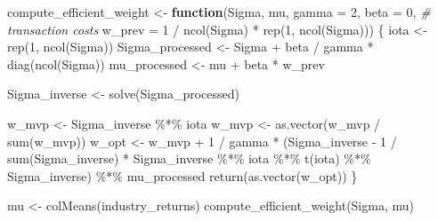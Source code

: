 \documentclass[
]{krantz}
\newenvironment{Shaded}{\begin{snugshade}}{\end{snugshade}}
\newcommand{\AttributeTok}[1]{\textcolor[rgb]{0.61,0.61,0.61}{#1}}
\newcommand{\CommentTok}[1]{\textcolor[rgb]{0.37,0.37,0.37}{\textit{#1}}}
\newcommand{\ControlFlowTok}[1]{\textcolor[rgb]{0.27,0.27,0.27}{\textbf{#1}}}
\newcommand{\DecValTok}[1]{\textcolor[rgb]{0.06,0.06,0.06}{#1}}
\newcommand{\FunctionTok}[1]{\textcolor[rgb]{0,0,0}{#1}}
\newcommand{\NormalTok}[1]{#1}
\newcommand{\OtherTok}[1]{\textcolor[rgb]{0.37,0.37,0.37}{#1}}
\newcommand{\SpecialCharTok}[1]{\textcolor[rgb]{0,0,0}{#1}}
\begin{document}
\begin{Shaded}
\begin{Highlighting}[]
\NormalTok{compute\_efficient\_weight }\OtherTok{\textless{}{-}} \ControlFlowTok{function}\NormalTok{(Sigma,}
\NormalTok{                                     mu,}
                                     \AttributeTok{gamma =} \DecValTok{2}\NormalTok{,}
                                     \AttributeTok{beta =} \DecValTok{0}\NormalTok{, }\CommentTok{\# transaction costs}
                                     \AttributeTok{w\_prev =} \DecValTok{1} \SpecialCharTok{/} \FunctionTok{ncol}\NormalTok{(Sigma) }\SpecialCharTok{*} \FunctionTok{rep}\NormalTok{(}\DecValTok{1}\NormalTok{, }\FunctionTok{ncol}\NormalTok{(Sigma))) \{}
\NormalTok{  iota }\OtherTok{\textless{}{-}} \FunctionTok{rep}\NormalTok{(}\DecValTok{1}\NormalTok{, }\FunctionTok{ncol}\NormalTok{(Sigma))}
\NormalTok{  Sigma\_processed }\OtherTok{\textless{}{-}}\NormalTok{ Sigma }\SpecialCharTok{+}\NormalTok{ beta }\SpecialCharTok{/}\NormalTok{ gamma }\SpecialCharTok{*} \FunctionTok{diag}\NormalTok{(}\FunctionTok{ncol}\NormalTok{(Sigma))}
\NormalTok{  mu\_processed }\OtherTok{\textless{}{-}}\NormalTok{ mu }\SpecialCharTok{+}\NormalTok{ beta }\SpecialCharTok{*}\NormalTok{ w\_prev}

\NormalTok{  Sigma\_inverse }\OtherTok{\textless{}{-}} \FunctionTok{solve}\NormalTok{(Sigma\_processed)}

\NormalTok{  w\_mvp }\OtherTok{\textless{}{-}}\NormalTok{ Sigma\_inverse }\SpecialCharTok{\%*\%}\NormalTok{ iota}
\NormalTok{  w\_mvp }\OtherTok{\textless{}{-}} \FunctionTok{as.vector}\NormalTok{(w\_mvp }\SpecialCharTok{/} \FunctionTok{sum}\NormalTok{(w\_mvp))}
\NormalTok{  w\_opt }\OtherTok{\textless{}{-}}\NormalTok{ w\_mvp }\SpecialCharTok{+} \DecValTok{1} \SpecialCharTok{/}\NormalTok{ gamma }\SpecialCharTok{*}
\NormalTok{    (Sigma\_inverse }\SpecialCharTok{{-}} \DecValTok{1} \SpecialCharTok{/} \FunctionTok{sum}\NormalTok{(Sigma\_inverse) }\SpecialCharTok{*}\NormalTok{ Sigma\_inverse }\SpecialCharTok{\%*\%}\NormalTok{ iota }\SpecialCharTok{\%*\%} \FunctionTok{t}\NormalTok{(iota) }\SpecialCharTok{\%*\%}\NormalTok{ Sigma\_inverse) }\SpecialCharTok{\%*\%}
\NormalTok{      mu\_processed}
  \FunctionTok{return}\NormalTok{(}\FunctionTok{as.vector}\NormalTok{(w\_opt))}
\NormalTok{\}}

\NormalTok{mu }\OtherTok{\textless{}{-}} \FunctionTok{colMeans}\NormalTok{(industry\_returns)}
\FunctionTok{compute\_efficient\_weight}\NormalTok{(Sigma, mu)}
\end{Highlighting}
\end{Shaded}
\end{document}
